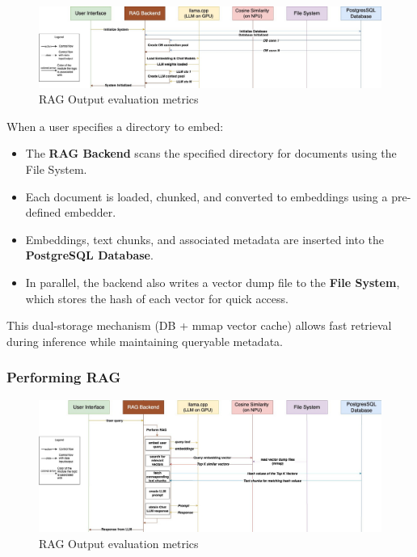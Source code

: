 \begin{figure}[H]
    \centering
    \includegraphics[width=1.0\linewidth]{images/tldr-app-worklfow-pt1.jpg}
    \caption{RAG Output evaluation metrics ~\cite{cardenas2023rag}}
    \label{fig:autoregressive_decoding}
\end{figure}

When a user specifies a directory to embed:

\begin{itemize}
    \item The \textbf{RAG Backend} scans the specified directory for documents using the File System.
    \item Each document is loaded, chunked, and converted to embeddings using a pre-defined embedder.
    \item Embeddings, text chunks, and associated metadata are inserted into the \textbf{PostgreSQL Database}.
    \item In parallel, the backend also writes a vector dump file to the \textbf{File System}, which stores the hash of each vector for quick access.
\end{itemize}

This dual-storage mechanism (DB + mmap vector cache) allows fast retrieval during inference while maintaining queryable metadata.


\subsubsection{Performing RAG}
\label{subsec:AppDesignWorkflow-PerformingRAG}


\begin{figure}[H]
    \centering
    \includegraphics[width=1.0\linewidth]{images/tldr-app-worklfow-pt3.jpg}
    \caption{RAG Output evaluation metrics ~\cite{cardenas2023rag}}
    \label{fig:autoregressive_decoding}
\end{figure}


